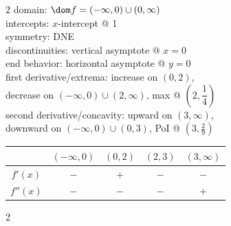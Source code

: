\documentclass{book}
\begin{document}
\begin{appendices}
\begin{enumerate}[!HW!]
\begin{multicols}{2}
domain: $\dom f = (-\infty,0)\cup(0,\infty)$ \\
intercepts: $x$-intercept @ 1\\
symmetry: DNE \\ 
discontinuities: vertical asymptote @ $x=0$\\
end behavior: horizontal asymptote @ $y=0$\\
first derivative/extrema: increase on $(0,2)$,\\ decrease on $(-\infty,0)\cup(2,\infty)$, max @ $\left(2,\dfrac{1}{4}\right)$\\
second derivative/concavity: upward on $(3,\infty)$,\\ downward on $(-\infty,0)\cup (0,3)$, PoI @ $\left(3,\frac{2}{9}\right)$\vspace{-15pt}
\begin{center}
\begin{tabular}{c|c|c|c|c}
 & $(-\infty, 0)$ & $(0, 2)$ & $(2,3)$ & $(3,\infty)$ \\ \hline
$f'(x)$ & $-$ & $+$ & $-$ & $-$\\ 
$f''(x)$ & $-$ & $-$ & $-$ & $+$ \\ 
\end{tabular}
\end{center} 
\end{multicols}\pagebreak

\itemspade \mbox{}\vspace{-25pt}

\begin{multicols}{2}
\columnbreak


\end{multicols}
\end{enumerate}
\end{appendices}
\end{document}
